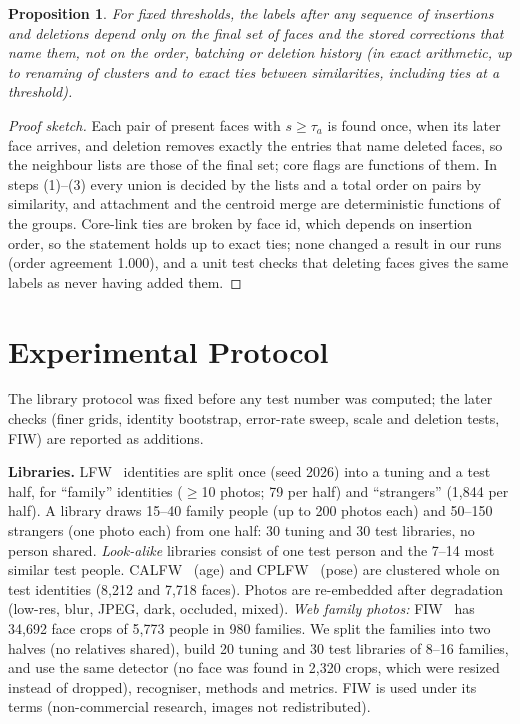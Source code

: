 \documentclass[conference]{IEEEtran}
\newtheorem{proposition}{Proposition}
\begin{document}
\begin{proposition}
For fixed thresholds, the labels after any sequence of insertions and deletions depend only on the final set of faces and
the stored corrections that name them, not on the order, batching or deletion history (in exact arithmetic, up to renaming of clusters and to exact
ties between similarities, including ties at a threshold).
\end{proposition}
\begin{proof}[Proof sketch]
Each pair of present faces with $s\ge\tau_a$ is found once, when its later face arrives, and deletion removes exactly the
entries that name deleted faces, so the neighbour lists are those of the final set; core flags are functions of them. In steps
(1)--(3) every union is decided by the lists and a total order on pairs by similarity, and attachment and the centroid merge are
deterministic functions of the groups. Core-link ties are broken by face id, which depends on insertion order, so the statement
holds up to exact ties; none changed a result in our runs (order agreement 1.000), and a unit test checks that deleting faces
gives the same labels as never having added them.
\end{proof}
\section{Experimental Protocol}\label{sec:protocol}
The library protocol was fixed before any test number was computed; the later checks (finer grids, identity bootstrap,
error-rate sweep, scale and deletion tests, FIW) are reported as additions.

\textbf{Libraries.} LFW~\cite{huang2007lfw} identities are split once (seed 2026) into a tuning and a test half, for ``family''
identities ($\ge$10 photos; 79 per half) and ``strangers'' (1{,}844 per half). A library draws 15--40 family people (up to 200
photos each) and 50--150 strangers (one photo each) from one half: 30 tuning and 30 test libraries, no person shared.
\emph{Look-alike} libraries consist of one test person and the 7--14 most similar test people. CALFW~\cite{zheng2017calfw} (age) and
CPLFW~\cite{zheng2018cplfw} (pose) are clustered whole on test identities (8{,}212 and 7{,}718 faces). Photos are re-embedded
after degradation (low-res, blur, JPEG, dark, occluded, mixed).
\emph{Web family photos:} FIW~\cite{robinson2016fiw,robinson2018fiw} has 34{,}692 face crops of 5{,}773 people in 980 families. We split
the families into two halves (no relatives shared), build 20 tuning and 30 test libraries of 8--16 families, and use the same
detector (no face was found in 2{,}320 crops, which were resized instead of dropped), recogniser, methods and metrics. FIW is used
under its terms (non-commercial research, images not redistributed).
\end{document}
